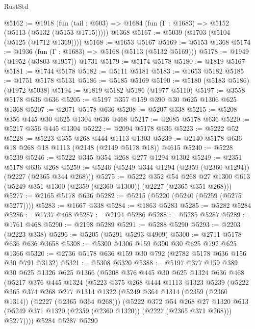 \begin{lexlean}{RustStd}
\begin{coremodule}
@5162 := @1918
    (fun (tail : @603) => @1684 (fun (Γ : @1683) => @5152 (@5113 (@5132 (@5153 @1715)))))
    @1368
@5167 := @5039 (@1703 (@5104 (@5125 (@1712 @1369))))
@5168 := @1653 @5167
@5169 := @5153 @1368
@5174 := @1936 (fun (Γ : @1683) => @5168 (@5113 (@5132 @5169)))
@5178 := @1949 (@1952 (@3803 @1957)) @1731
@5179 := @5174 @5178
@5180 := @1819 @5167
@5181 := @1744 @5178
@5182 := @5111 @5181
@5183 := @1653 @5182
@5185 := @1751 @5178 @5131
@5186 := @5185 @5169
@5190 := @5180 (@5183 @5186) (@1972 @5038)
@5194 := @1819 @5182 @5186 (@1977 @5110)
@5197 := @3558 @5178 @636 @636
@5205 := @5197 @357 @159 @390 @30 @625 @1306 @625 @1368
@5207 := @2071 @5178 @636
@5208 := @5207 @338
@5215 := @5208 @356 @445 @30 @625 @1304 @636 @468
@5217 := @2085 @5178 @636
@5220 := @5217 @356 @445 @1304
@5222 := @2094 @5178 @636
@5223 := @5222 @52
@5228 := @5223 @355 @268 @444 @1113 @1303
@5239 := @2140 @5178 @636 @18 @268 @18 @1113 (@2148 (@2149 @5178 @18)) @4615
@5240 := @5228 @5239
@5246 := @5222 @345 @354 @268 @277 @1294 @1302
@5249 := @2351 @5178 @636 @268
@5259 := @5246 (@5249 @344 @1294 (@2359 (@2360 @1294)) (@2227 (@2365 @344 @268)))
@5275 := @5222
    @352
    @54
    @268
    @27
    @1300
    @613
    (@5249 @351 @1300 (@2359 (@2360 @1300)) (@2227 (@2365 @351 @268)))
@5277 := @2165 @5178 @636
@5282 := @5215 (@5220 (@5240 (@5259 (@5275 @5277))))
@5283 := @1667 @338
@5284 := @1863 @5283
@5285 := @5282 @5284
@5286 := @1737 @468
@5287 := @2194 @5286
@5288 := @5285 @5287
@5289 := @1761 @468
@5290 := @2198 @5289
@5291 := @5288 @5290
@5293 := @2203 (@2223 @338)
@5296 := @5205 (@5291 @5293 @4909)
@5300 := @2711 @5178 @636 @636 @3658
@5308 := @5300 @1306 @159 @390 @30 @625 @792 @625 @1366
@5320 := @2736 @5178 @636 @159 @30 @792 (@2782 @5178 @636 @156 @30 @791 @3132)
@5321 := @5308 @5320
@5388 := @5197
    @377
    @159
    @389
    @30
    @625
    @1326
    @625
    @1366
    (@5208
      @376
      @445
      @30
      @625
      @1324
      @636
      @468
      (@5217
        @376
        @445
        @1324
        (@5223
          @375
          @268
          @444
          @1113
          @1323
          @5239
          (@5222
            @365
            @374
            @268
            @277
            @1314
            @1322
            (@5249 @364 @1314 (@2359 (@2360 @1314)) (@2227 (@2365 @364 @268)))
            (@5222
              @372
              @54
              @268
              @27
              @1320
              @613
              (@5249 @371 @1320 (@2359 (@2360 @1320)) (@2227 (@2365 @371 @268)))
              @5277))))
      @5284
      @5287
      @5290

\end{coremodule}
\end{lexlean}
